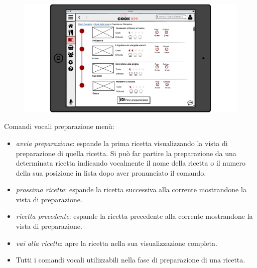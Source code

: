 \begin{figure}[H]
	\centering
	\includegraphics[width=0.95\linewidth]{img/mockup/menu-preparazione-3.png}
\end{figure}
Comandi vocali preparazione menù:
\begin{itemize}
\item \emph{avvia preparazione}: espande la prima ricetta visualizzando la
vista di preparazione di quella ricetta. Si può far partire la
preparazione da una determinata ricetta indicando vocalmente il nome della ricetta
o il numero della sua posizione in lista dopo aver pronunciato il
comando.
\item \emph{prossima ricetta}: espande la ricetta successiva alla corrente
mostrandone la vista di preparazione. 
\item \emph{ricetta precedente}: espande la ricetta precedente alla corrente
mostrandone la vista di preparazione.
\item \emph{vai alla ricetta}: apre la ricetta nella sua visualizzazione
completa.
\item Tutti i comandi vocali utilizzabili nella fase di preparazione di una
ricetta.
\end{itemize}
